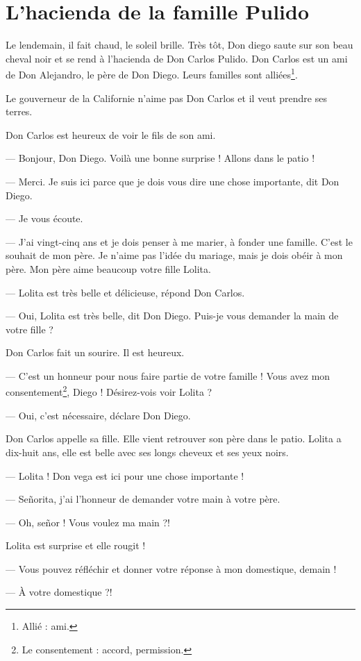 \chapter{L'hacienda de la famille Pulido}
Le lendemain, il fait chaud, le soleil brille. Très tôt, Don diego saute sur son beau cheval noir et se rend à
l'hacienda de Don Carlos Pulido. Don Carlos est un ami de Don Alejandro, le père de Don Diego. Leurs familles sont
alliées\footnote{Allié : ami.}.

Le gouverneur de la Californie n'aime pas Don Carlos et il veut prendre ses terres.

Don Carlos est heureux de voir le fils de son ami.

--- Bonjour, Don Diego. Voilà une bonne surprise ! Allons dans le patio !

--- Merci. Je suis ici parce que je dois vous dire une chose importante, dit Don Diego.

--- Je vous écoute.

--- J'ai vingt-cinq ans et je dois penser à me marier, à fonder une famille. C'est le souhait de mon père. Je n'aime
    pas l'idée du mariage, mais je dois obéir à mon père. Mon père aime beaucoup votre fille Lolita.

--- Lolita est très belle et délicieuse, répond Don Carlos.

--- Oui, Lolita est très belle, dit Don Diego. Puis-je vous demander la main de votre fille ?

Don Carlos fait un sourire. Il est heureux.

--- C'est un honneur pour nous faire partie de votre famille ! Vous avez mon consentement\footnote{Le consentement :
    accord, permission.}, Diego ! Désirez-vois voir Lolita ?

--- Oui, c'est nécessaire, déclare Don Diego.

Don Carlos appelle sa fille. Elle vient retrouver son père dans le patio. Lolita a dix-huit ans, elle est belle avec
ses longs cheveux et ses yeux noirs.

--- Lolita ! Don vega est ici pour une chose importante !

--- Señorita, j'ai l'honneur de demander votre main à votre père.

--- Oh, señor ! Vous voulez ma main ?!

Lolita est surprise et elle rougit !

--- Vous pouvez réfléchir et donner votre réponse à mon domestique, demain !

--- À votre domestique ?!

